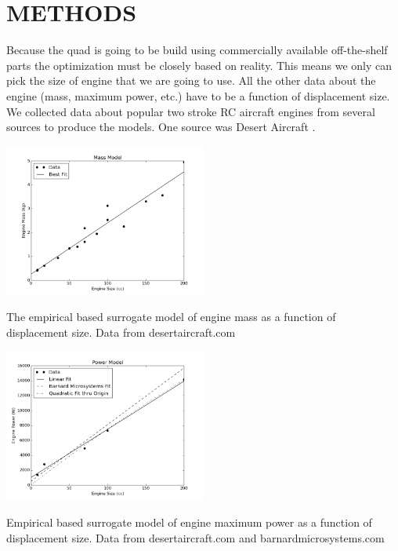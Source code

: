 \documentclass[letterpaper, 10 pt, conference]{ieeeconf}  %
\makeatletter
\newenvironment{figurehere}
  {\def\@captype{figure}}
  {}
\makeatother
\begin{document}
	
\section{METHODS}

Because the quad is going to be build using commercially available off-the-shelf parts the optimization must be closely based on reality.  This means we only can pick the size of engine that we are going to use.  All the other data about the engine (mass, maximum power, etc.) have to be a function of displacement size.  We collected data about popular two stroke RC aircraft engines from several sources to produce the models. One source was Desert Aircraft \cite{da2016}.

\begin{figurehere}
	\includegraphics[width=0.5\textwidth]{mass.png}
	\caption{The empirical based surrogate model of engine mass as a function of displacement size. Data from desertaircraft.com \cite{da2016}}
		\label{fig:mass}
\end{figurehere}

\begin{figurehere}
	\includegraphics[width=0.5\textwidth]{max_power.png}
	\caption{Empirical based surrogate model of engine maximum power as a function of displacement size. Data from desertaircraft.com \cite{da2016} and barnardmicrosystems.com \cite{barnardmiro2016}}
		\label{fig:power}
\end{figurehere}
\end{document}
